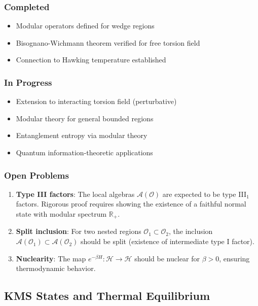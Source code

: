 \subsubsection{Completed}
\begin{itemize}
    \item Modular operators defined for wedge regions
    \item Bisognano-Wichmann theorem verified for free torsion field
    \item Connection to Hawking temperature established
\end{itemize}

\subsubsection{In Progress}
\begin{itemize}
    \item Extension to interacting torsion field (perturbative)
    \item Modular theory for general bounded regions
    \item Entanglement entropy via modular theory
    \item Quantum information-theoretic applications
\end{itemize}

\subsubsection{Open Problems}
\begin{enumerate}
    \item \textbf{Type III factors}: The local algebras $\mathcal{A}(\mathcal{O})$ are expected to be type III$_1$ factors. Rigorous proof requires showing the existence of a faithful normal state with modular spectrum $\mathbb{R}_+$.
    
    \item \textbf{Split inclusion}: For two nested regions $\mathcal{O}_1 \subset \mathcal{O}_2$, the inclusion $\mathcal{A}(\mathcal{O}_1) \subset \mathcal{A}(\mathcal{O}_2)$ should be split (existence of intermediate type I factor).
    
    \item \textbf{Nuclearity}: The map $e^{-\beta H} : \mathcal{H} \to \mathcal{H}$ should be nuclear for $\beta > 0$, ensuring thermodynamic behavior.
\end{enumerate}

\subsection{KMS States and Thermal Equilibrium}

